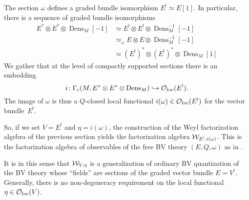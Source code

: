 \documentclass[11pt]{amsart}
\renewcommand{\op}{\operatorname}
\begin{document}
The section $\omega$ defines a graded bundle isomorphism $E^! \simeq E[1]$.
In particular, there is a sequence of graded bundle isomorphisms
\begin{align*}
E^* \otimes E^* \otimes \op{Dens}_M [-1] & \simeq E^! \otimes E^! \otimes \op{Dens}_M^{-1} [-1] \\ & \simeq_{\omega} E \otimes E \otimes \op{Dens}_M^{-1} [-1] \\ & \simeq (E^!)^* \otimes (E^!)^* \otimes \op{Dens}_M [1]
\end{align*}
We gather that at the level of compactly supported sections there is an embedding
\begin{equation}
i \colon \Gamma_c (M, E^* \otimes E^* \otimes \op{Dens}_M) \hookrightarrow \oloc(E^!) .
\end{equation}
The image of $\omega$ is thus a $Q$-closed local functional $i(\omega) \in {\mathcal O}_{loc}(E^!)$ for the vector bundle~$E^!$.

So, if we set $V = E^!$ and $\eta = i(\omega)$, the construction of the Weyl factorization algebra of the previous section yields the factorization algebra $\mathcal W_{E^!, i(\omega)}$.
This is the factorization algebra of observables of the free BV theory $(E,Q,\omega)$ as in \cite{CG2}.

It is in this sense that $\mathcal W_{V,\eta}$ is a generalization of ordinary BV quantization of the BV theory whose ``fields'' are sections of the graded vector bundle $E = V^!$.
Generally, there is no non-degeneracy requirement on the local functional $\eta \in {\mathcal O}_{loc}(V)$.
\end{document}

